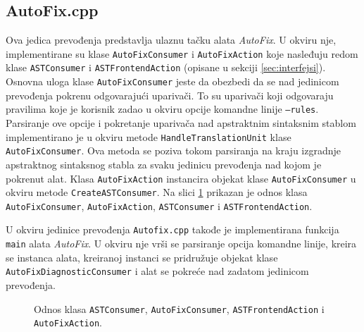\documentclass[12pt,oneside]{memoir}
\begin{document}
\subsection{AutoFix.cpp}
Ova jedica prevođenja predstavlja ulaznu ta\v{c}ku alata \textit{AutoFix}. U okviru nje, implementirane su klase \texttt{AutoFixConsumer} i \texttt{AutoFixAction} koje nasleđuju redom klase \texttt{ASTConsumer} i \texttt{ASTFrontendAction} (opisane u sekciji \ref{sec:interfejsi}). Osnovna uloga klase \texttt{AutoFixConsumer} jeste da obezbedi da se nad jedinicom prevođenja pokrenu odgovaraju\'{c}i upariva\v{c}i. To su upariva\v{c}i koji odgovaraju pravilima koje je korisnik zadao u okviru opcije komandne linije \texttt{--rules}. Parsiranje ove opcije i  pokretanje upariva\v{c}a nad apstraktnim sintaksnim stablom implementirano je u okviru metode \texttt{HandleTranslation\-Unit} klase \texttt{AutoFixConsumer}. Ova metoda se poziva tokom parsiranja na kraju izgradnje apstraktnog sintaksnog stabla za svaku jedinicu prevođenja nad kojom je pokrenut alat. Klasa \texttt{AutoFixAction} instancira objekat klase \texttt{AutoFixConsumer} u okviru metode \texttt{CreateASTConsumer}.
Na slici \ref{fig:uml1} prikazan je odnos klasa \texttt{AutoFixConsumer}, \texttt{AutoFixAction}, \texttt{ASTConsumer} i \texttt{ASTFrontendAction}. \par
U okviru jedinice prevođenja \texttt{Autofix.cpp} takođe je implementirana funkcija \texttt{main} alata \textit{AutoFix}. U okviru nje vr\v{s}i se parsiranje opcija komandne linije, kreira se instanca alata, kreiranoj instanci se pridru\v{z}uje objekat klase \texttt{AutoFix\-DiagnosticConsumer} i alat se pokre\'{c}e nad zadatom jedinicom prevođenja. 

\begin{figure}
  \caption{Odnos klasa \texttt{ASTConsumer}, \texttt{AutoFixConsumer}, \texttt{ASTFrontendAction} i \texttt{AutoFixAction}.}
  \label{fig:uml1}

\end{figure}
\end{document}

